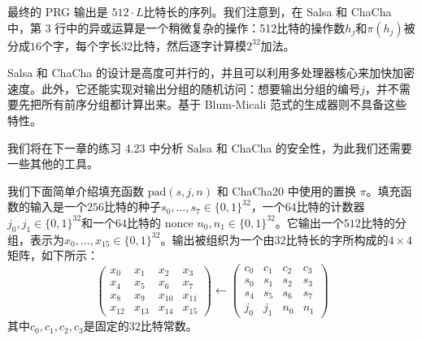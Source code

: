 \vspace*{5pt}

\noindent
最终的 PRG 输出是 $512\cdot L$比特长的序列。我们注意到，在 Salsa 和 ChaCha 中，第 3 行中的异或运算是一个稍微复杂的操作：512比特的操作数$h_j$和$\pi(h_j)$被分成$16$个字，每个字长$32$比特，然后逐字计算模$2^{32}$加法。

Salsa 和 ChaCha 的设计是高度可并行的，并且可以利用多处理器核心来加快加密速度。此外，它还能实现对输出分组的随机访问：想要输出分组的编号$j$，并不需要先把所有前序分组都计算出来。基于 Blum-Micali 范式的生成器则不具备这些特性。

我们将在下一章的练习 4.23 中分析 Salsa 和 ChaCha 的安全性，为此我们还需要一些其他的工具。

\begin{snote}[一些细节。]
我们下面简单介绍填充函数 $\mathrm{pad}(s,j,n)$ 和 ChaCha20 中使用的置换 $\pi$。填充函数的输入是一个$256$比特的种子$s_0,\dots,s_7\in\{0,1\}^{32}$，一个$64$比特的计数器$j_0,j_1\in\{0,1\}^{32}$和一个$64$比特的 nonce $n_0,n_1\in\{0,1\}^{32}$。它输出一个$512$比特的分组，表示为$x_0,\dots,x_{15}\in\{0,1\}^{32}$。输出被组织为一个由$32$比特长的字所构成的$4\times4$矩阵，如下所示：
\begin{equation}
\begin{pmatrix}
x_0 & x_1 & x_2 & x_3 \\
x_4 & x_5 & x_6 & x_7 \\
x_8 & x_9 & x_{10} & x_{11} \\
x_{12} & x_{13} & x_{14} & x_{15}
\end{pmatrix}
\longleftarrow
\begin{pmatrix}
c_0 & c_1 & c_2 & c_3 \\
s_0 & s_1 & s_2 & s_3 \\
s_4 & s_5 & s_6 & s_7 \\
j_0 & j_1 & n_0 & n_1
\end{pmatrix}
\end{equation}
其中$c_0,c_1,c_2,c_3$是固定的$32$比特常数。


\end{snote}
